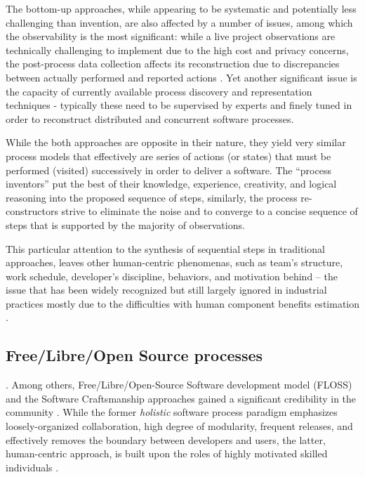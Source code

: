 The bottom-up approaches, while appearing to be systematic and potentially less challenging than invention, 
are also affected by a number of issues, among which the observability is the most significant: 
while a live project observations are technically challenging to implement due to the high cost and 
privacy concerns, the post-process data collection affects its reconstruction due to 
discrepancies between actually performed and reported actions \cite{citeulike:7691059}. 
Yet another significant issue is the capacity of currently available process discovery and representation 
techniques - typically these need to be supervised by experts and finely tuned in order to reconstruct 
distributed and concurrent software processes. 

While the both approaches are opposite in their nature, they yield very similar process models that 
effectively are series of actions (or states) that must be performed (visited) successively in order 
to deliver a software. The ``process inventors'' put the best of their knowledge, experience, creativity,
and logical reasoning into the proposed sequence of steps, similarly, the process re-constructors 
strive to eliminate the noise and to converge to a concise sequence of steps that is supported by the 
majority of observations. 

This particular attention to the synthesis of sequential steps in traditional approaches, 
leaves other human-centric phenomenas, such as team's structure, work schedule, 
developer's discipline, behaviors, and motivation behind -- 
the issue that has been widely recognized \cite{citeulike:149387} \cite{citeulike:113403} 
\cite{citeulike:205322} \cite{citeulike:12798652} but still largely ignored in industrial practices 
mostly due to the  difficulties with human component benefits estimation 
\cite{citeulike:12798659} \cite{citeulike:12798662} \cite{csdl2-12-11}.

%
%
\subsection{Free/Libre/Open Source processes}\label{sec_floss_processes}

. Among others, 
Free/Libre/Open-Source Software development model (FLOSS) and the Software Craftsmanship 
approaches gained a significant credibility in the community \cite{citeulike:3729379}. 
While the former \textit{holistic} software process paradigm emphasizes loosely-organized 
collaboration, high degree of modularity, frequent releases, and effectively removes the boundary 
between developers and users, the latter, human-centric approach, is built upon the roles of highly 
motivated skilled individuals \cite{citeulike:262020} \cite{citeulike:2759198}. 



